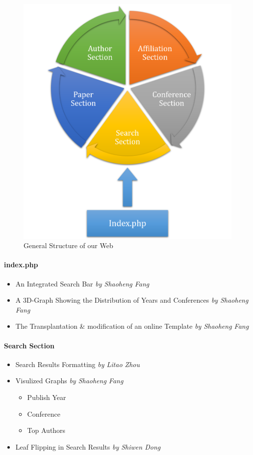 \documentclass{book}
\begin{document}
\begin{figure}[htp]
\centering
\includegraphics[scale=0.5]{img/zlt_pre_1.png}
\caption{General Structure of our Web}
\end{figure}

\paragraph{index.php}

\begin{itemize}
\item An Integrated Search Bar \textit{by Shaoheng Fang}
\item A 3D-Graph Showing the Distribution of Years and Conferences \textit{by Shaoheng Fang}
\item The Transplantation \& modification of an online Template  \textit{by Shaoheng Fang}
\end{itemize}

\paragraph{Search Section}
\begin{itemize}
\item Search Results Formatting \textit{by Litao Zhou}
\item Visulized Graphs \textit{by Shaoheng Fang}
\begin{itemize}
	\item Publish Year
	\item Conference
	\item Top Authors
\end{itemize}
\item Leaf Flipping in Search Results \textit{by Shiwen Dong}
\end{itemize}
\end{document}
